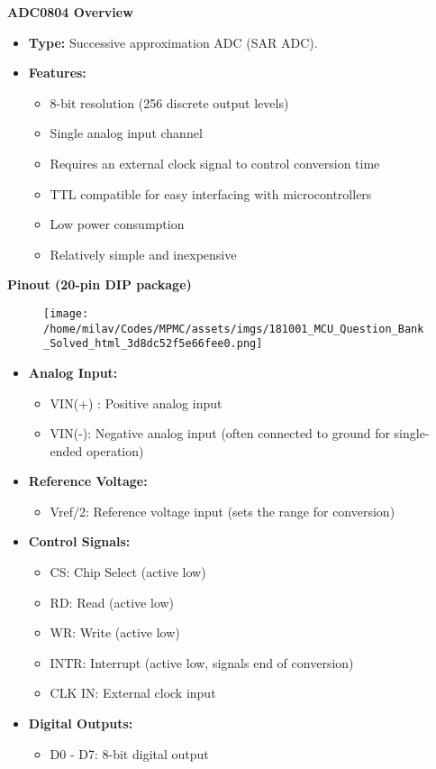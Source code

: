 \documentclass[
]{article}
\begin{document}
\textbf{ADC0804 Overview}

\begin{itemize}
\item
  \textbf{Type:} Successive approximation ADC (SAR ADC).
\item
  \textbf{Features:}

  \begin{itemize}
  \item
    8-bit resolution (256 discrete output levels)
  \item
    Single analog input channel
  \item
    Requires an external clock signal to control conversion time
  \item
    TTL compatible for easy interfacing with microcontrollers
  \item
    Low power consumption
  \item
    Relatively simple and inexpensive
  \end{itemize}
\end{itemize}

\textbf{Pinout (20-pin DIP package)}

\begin{figure}
\centering
\texttt{[image: /home/milav/Codes/MPMC/assets/imgs/181001\_MCU\_Question\_Bank\_Solved\_html\_3d8dc52f5e66fee0.png]}
\caption{}
\end{figure}

\begin{itemize}
\item
  \textbf{Analog Input:}

  \begin{itemize}
  \item
    VIN(+) : Positive analog input
  \item
    VIN(-): Negative analog input (often connected to ground for
    single-ended operation)
  \end{itemize}
\item
  \textbf{Reference Voltage:}

  \begin{itemize}
  \item
    Vref/2: Reference voltage input (sets the range for conversion)
  \end{itemize}
\item
  \textbf{Control Signals:}

  \begin{itemize}
  \item
    CS: Chip Select (active low)
  \item
    RD: Read (active low)
  \item
    WR: Write (active low)
  \item
    INTR: Interrupt (active low, signals end of conversion)
  \item
    CLK IN: External clock input
  \end{itemize}
\item
  \textbf{Digital Outputs:}

  \begin{itemize}
  \item
    D0 - D7: 8-bit digital output
  \end{itemize}
\end{itemize}
\end{document}
